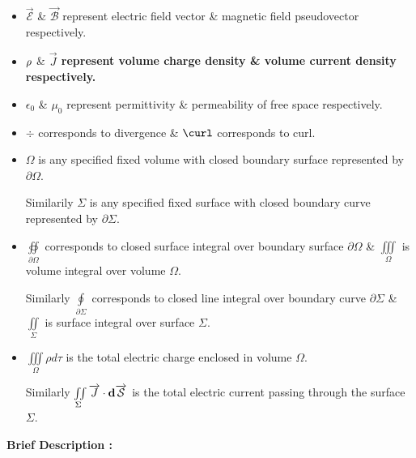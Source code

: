 \begin{itemize}
	\item $ \overrightarrow{\mathcal E} $ \& $ \overrightarrow{\mathcal B} $ represent electric field vector \& magnetic field pseudovector respectively.
	

	\item $ \bf{\rho} $ \& \bf{ $ \overrightarrow{J} $ } represent volume charge density \& volume current density respectively. 
	

	\item $ \epsilon_{0} $ \& $ \mu_{0} $ represent permittivity \& permeability of free space respectively.
	

	\item $ \div $ corresponds to divergence \& $ \curl $ corresponds to curl.
	

	\item $ \Omega $ is any specified fixed volume with closed boundary surface represented by $ \partial\Omega $.

		Similarily $ \Sigma $ is any specified fixed surface with closed boundary curve represented by $ \partial\Sigma $.
	

	\item $ \oiint \limits_{\partial\Omega} $ corresponds to closed surface integral over boundary surface $ \partial\Omega $ \& $ \iiint \limits_{\Omega} $ is volume integral over volume $ \Omega $.
		
		Similarly $ \oint \limits_{\partial\Sigma} $ corresponds to closed line integral over boundary curve $ \partial\Sigma $ \& $ \iint \limits_{\Sigma} $ is surface integral over surface $ \Sigma $.
	

	\item $ \iiint \limits_{\Omega} \rho d\tau $ is the total electric charge enclosed in volume $ \Omega $.

		Similarly $ \iint \limits_{\Sigma} \bf{\overrightarrow{J}} \cdot d\overrightarrow{\mathcal S} $ is the total electric current passing through the surface $ \Sigma $.
\end{itemize}


\bf{Brief Description :}

